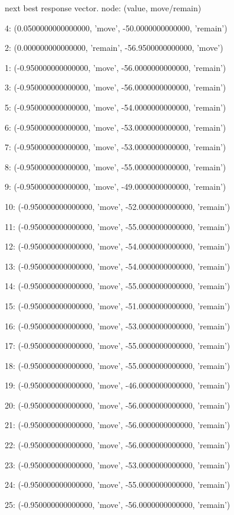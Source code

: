  next best response vector.  node: (value, move/remain)


4: (0.0500000000000000, 'move', -50.0000000000000, 'remain')


2: (0.000000000000000, 'remain', -56.9500000000000, 'move')


1: (-0.950000000000000, 'move', -56.0000000000000, 'remain')


3: (-0.950000000000000, 'move', -56.0000000000000, 'remain')


5: (-0.950000000000000, 'move', -54.0000000000000, 'remain')


6: (-0.950000000000000, 'move', -53.0000000000000, 'remain')


7: (-0.950000000000000, 'move', -53.0000000000000, 'remain')


8: (-0.950000000000000, 'move', -55.0000000000000, 'remain')


9: (-0.950000000000000, 'move', -49.0000000000000, 'remain')


10: (-0.950000000000000, 'move', -52.0000000000000, 'remain')


11: (-0.950000000000000, 'move', -55.0000000000000, 'remain')


12: (-0.950000000000000, 'move', -54.0000000000000, 'remain')


13: (-0.950000000000000, 'move', -54.0000000000000, 'remain')


14: (-0.950000000000000, 'move', -55.0000000000000, 'remain')


15: (-0.950000000000000, 'move', -51.0000000000000, 'remain')


16: (-0.950000000000000, 'move', -53.0000000000000, 'remain')


17: (-0.950000000000000, 'move', -55.0000000000000, 'remain')


18: (-0.950000000000000, 'move', -55.0000000000000, 'remain')


19: (-0.950000000000000, 'move', -46.0000000000000, 'remain')


20: (-0.950000000000000, 'move', -56.0000000000000, 'remain')


21: (-0.950000000000000, 'move', -56.0000000000000, 'remain')


22: (-0.950000000000000, 'move', -56.0000000000000, 'remain')


23: (-0.950000000000000, 'move', -53.0000000000000, 'remain')


24: (-0.950000000000000, 'move', -55.0000000000000, 'remain')


25: (-0.950000000000000, 'move', -56.0000000000000, 'remain')


